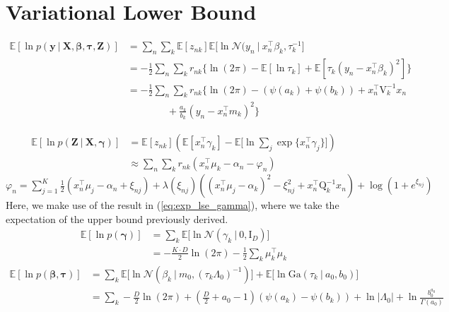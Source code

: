 \documentclass[twoside,11pt]{article}
\newcommand{\tr}{\intercal}
\newcommand{\eye}{\mathrm{I}}
\newcommand\given[1][]{\:#1\vert\:}
\newcommand{\transpose}[1]{#1^{\intercal}}
\newcommand{\nsum}{\sum_{n}}
\newcommand{\ksum}{\sum_{k}}
\newcommand{\boldbeta}{\boldsymbol\beta}
\newcommand{\boldgamma}{\boldsymbol\gamma}
\newcommand{\boldtau}{\boldsymbol\tau}
\newcommand{\E}{\mathbb{E}}
\newcommand{\pr}[1]{p \left( #1 \right)}
\begin{document}
\section{Variational Lower Bound} \label{app:elbo}  %

\begin{equation} \label{eq:e1_deriv}
\begin{split}
	\E[\ln\pr{\mathbf{y} \given \mathbf{X}, \boldbeta, \boldtau, \mathbf{Z}}] &= \nsum \ksum \E[z_{nk}] \E \Bigg[ \ln \mathcal{N}(y_n \given \transpose{x_n} \beta_k, \tau_k^{-1}\Bigg]  \\
	&= -\frac{1}{2} \nsum \ksum r_{nk} \Big\{ \ln(2 \pi) - \E[\ln \tau_k] + \E[\tau_k \left( y_n - \transpose{x_n} \beta_k\right)^2]\Big\} \\
	&= -\frac{1}{2}\nsum \ksum r_{nk} \Big\{ \ln (2\pi) - (\psi(a_k) + \psi(b_k)) + \transpose{x_n}\mathrm{V}_k^{-1}x_n \\ & \qquad \qquad + \frac{a_k}{b_k}(y_n - \transpose{x_n}m_k)^2 \Big\}
\end{split}
\end{equation}

\begin{equation} \label{eq:e2_deriv}
\begin{split}
	\E[\ln \pr{\mathbf{Z} \given \mathbf{X}, \boldgamma}] &= \E[z_{nk}] \left( \E[\transpose{x_n} \gamma_k] - \E\Big[\ln \sum_{j} \exp \{ \transpose{x_n}\gamma_j\}\Big]\right)\\
	&\approx \nsum \ksum r_{nk} \left( \transpose{x_n}\mu_k - \alpha_n - \varphi_n \right)
\end{split}
\end{equation}
$\varphi_n = \sum\limits_{j=1}^K \frac{1}{2}\left(x_n^{\tr}\mu_j - \alpha_n + \xi_{nj}\right) + \lambda(\xi_{nj}) \left( (x_n^{\tr} \mu_j - \alpha_k)^2 - \xi_{nj}^2 + x_n^{\tr} \mathrm{Q}_k^{-1} x_n \right) + \log( 1 + e^{\xi_{nj}})$
Here, we make use of the result in (\ref{eq:exp_lse_gamma}), where we take the expectation of the upper bound previously derived. 
\begin{equation} \label{eq:e3_deriv}
\begin{split}
	\E[\ln \pr{\boldgamma}] &= \ksum \E \Big[ \ln \mathcal{N}\left( \gamma_k \given 0, \eye_D\right)\Big] \\
	&= -\frac{K \cdot D}{2} \ln (2\pi) - \frac{1}{2} \ksum \transpose{\mu_k}\mu_k
\end{split}
\end{equation}
\begin{equation} \label{eq:e4_deriv}
\begin{split}
	\E[\ln \pr{\boldbeta, \boldtau}] &= \ksum \E\Big[\ln \mathcal{N}\left( \beta_k \given m_0, \left(\tau_k \Lambda_0 \right)^{-1} \right)\Big] + \E\Big[\ln \mathrm{Ga}\left( \tau_k \given a_0, b_0\right)\Big]\\
	&= \ksum -\frac{D}{2}\ln(2\pi) + \left( \frac{D}{2} + a_0 - 1 \right) (\psi(a_k) - \psi(b_k)) + \ln |\Lambda_0| + \ln \frac{b_0^{a_0}}{\Gamma(a_0)}
\end{split}
\end{equation}
\end{document}
